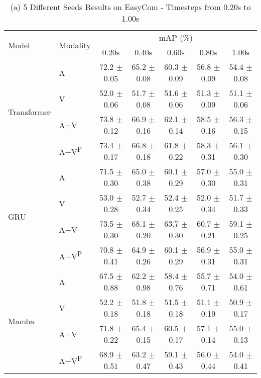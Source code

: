\begin{table*}[t]
\centering
\footnotesize

\begin{subtable}{\textwidth}
\centering
\begin{adjustbox}{width=\textwidth, center}
\begin{tabular}{llccccc}
\toprule
\multirow{2}{*}{Model} & \multirow{2}{*}{Modality} & \multicolumn{5}{c}{mAP (\%)} \\
\cmidrule(lr){3-7}
 & & 0.20s & 0.40s & 0.60s & 0.80s & 1.00s \\
\midrule
\multirow{4}{*}{\centering Transformer} 
 & A & 72.2 $\pm$ 0.05 & 65.2 $\pm$ 0.08 & 60.3 $\pm$ 0.09 & 56.8 $\pm$ 0.09 & 54.4 $\pm$ 0.08 
 \\
 & V & 52.0 $\pm$ 0.06 & 51.7 $\pm$ 0.08 & 51.6 $\pm$ 0.06 & 51.3 $\pm$ 0.09 & 51.1 $\pm$ 0.06 
 \\
 & A+V & 73.8 $\pm$ 0.12 & 66.9 $\pm$ 0.16 & 62.1 $\pm$ 0.14 & 58.5 $\pm$ 0.16 & 56.3 $\pm$ 0.15 
 \\
 & A+V\textsuperscript{P} & 73.4 $\pm$ 0.17 & 66.8 $\pm$ 0.18 & 61.8 $\pm$ 0.22 & 58.3 $\pm$ 0.31 & 56.1 $\pm$ 0.30
 \\
\midrule
\multirow{4}{*}{\centering GRU} 
 & A & 71.5 $\pm$ 0.30 & 65.0 $\pm$ 0.38 & 60.1 $\pm$ 0.29 & 57.0 $\pm$ 0.30 & 55.0 $\pm$ 0.31   
 \\
 & V & 53.0 $\pm$ 0.28 & 52.7 $\pm$ 0.34 & 52.4 $\pm$ 0.25 & 52.0 $\pm$ 0.34 & 51.7 $\pm$ 0.33  
 \\
 & A+V & 73.5 $\pm$ 0.30 & 68.1 $\pm$ 0.20 & 63.7 $\pm$ 0.30 & 60.7 $\pm$ 0.21 & 59.1 $\pm$ 0.25  
 \\
 & A+V\textsuperscript{P} & 70.8 $\pm$ 0.41 & 64.9 $\pm$ 0.26 & 60.1 $\pm$ 0.29 & 56.9 $\pm$ 0.31 & 55.0 $\pm$ 0.31 
 \\
\midrule
\multirow{4}{*}{\centering Mamba} 
 & A & 67.5 $\pm$ 0.88 & 62.2 $\pm$ 0.98 & 58.4 $\pm$ 0.76 & 55.7 $\pm$ 0.71 & 54.0 $\pm$ 0.61 
 \\
 & V & 52.2 $\pm$ 0.18 & 51.8 $\pm$ 0.18 & 51.5 $\pm$ 0.18 & 51.1 $\pm$ 0.19 & 50.9 $\pm$ 0.17 
 \\
 & A+V & 71.8 $\pm$ 0.22 & 65.4 $\pm$ 0.15 & 60.5 $\pm$ 0.17 & 57.1 $\pm$ 0.14 & 55.0 $\pm$ 0.13 
 \\
 & A+V\textsuperscript{P} & 68.9 $\pm$ 0.51 & 63.2 $\pm$ 0.47 & 59.1 $\pm$ 0.43 & 56.0 $\pm$ 0.44 & 54.0 $\pm$ 0.41 
 \\
\bottomrule
\end{tabular}
\end{adjustbox}
\label{tab:timesteps_different_seeds_EasyCom_a}
\caption*{(a) 5 Different Seeds Results on EasyCom - Timesteps from 0.20s to 1.00s}
\end{subtable}



\end{table*}
